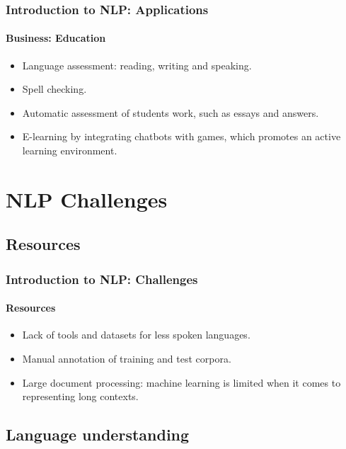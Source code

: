 \documentclass[xcolor=table]{beamer}
\begin{document}
\begin{frame}
\frametitle{Introduction to NLP: Applications}
\framesubtitle{Business: Education}

\begin{itemize}
	\item Language assessment: reading, writing and speaking.
	\item Spell checking.
	\item Automatic assessment of students work, such as essays and answers.
	\item E-learning by integrating chatbots with games, which promotes an active learning environment.
\end{itemize}

\end{frame}

\section{NLP Challenges}


\subsection{Resources}

\begin{frame}
\frametitle{Introduction to NLP: Challenges}
\framesubtitle{Resources}

\begin{itemize}
	\item Lack of tools and datasets for less spoken languages.
	\item Manual annotation of training and test corpora.
	\item Large document processing: machine learning is limited when it comes to representing long contexts.
\end{itemize}
\end{frame}

\subsection{Language understanding}
\end{document}
